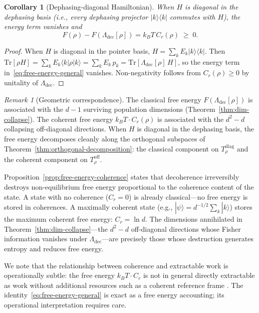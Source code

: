 \documentclass[12pt,a4paper]{article}
\newtheorem{corollary}[theorem]{Corollary}
\theoremstyle{definition}
\theoremstyle{remark}
\newtheorem{remark}[theorem]{Remark}
\begin{document}
\begin{corollary}[Dephasing-diagonal Hamiltonian]
\label{cor:diagonal-hamiltonian}
When $H$ is diagonal in the dephasing basis (i.e., every dephasing projector $|k\rangle\langle k|$ commutes with $H$), the energy term vanishes and
\begin{equation}
\label{eq:free-energy-diagonal-H}
F(\rho) - F(\Lambda_{\mathrm{dec}}[\rho]) = k_B T\, C_r(\rho) \;\geq\; 0.
\end{equation}
\end{corollary}

\begin{proof}
When $H$ is diagonal in the pointer basis, $H = \sum_k E_k |k\rangle\langle k|$.  Then $\mathrm{Tr}[\rho H] = \sum_k E_k \langle k|\rho|k\rangle = \sum_k E_k\, p_k = \mathrm{Tr}[\Lambda_{\mathrm{dec}}[\rho]\, H]$, so the energy term in~\eqref{eq:free-energy-general} vanishes.  Non-negativity follows from $C_r(\rho) \geq 0$ by unitality of $\Lambda_{\mathrm{dec}}$.
\end{proof}

\begin{remark}[Geometric correspondence]
\label{rem:geometric-correspondence}
The classical free energy $F(\Lambda_{\mathrm{dec}}[\rho])$ is associated with the $d - 1$ surviving population dimensions (Theorem~\ref{thm:dim-collapse}).  The coherent free energy $k_B T \cdot C_r(\rho)$ is associated with the $d^2 - d$ collapsing off-diagonal directions.  When $H$ is diagonal in the dephasing basis, the free energy decomposes cleanly along the orthogonal subspaces of Theorem~\ref{thm:orthogonal-decomposition}: the classical component on $T_\rho^{\mathrm{diag}}$ and the coherent component on $T_\rho^{\mathrm{off}}$.
\end{remark}

Proposition~\ref{prop:free-energy-coherence} states that decoherence irreversibly destroys non-equilibrium free energy proportional to the coherence content of the state.  A state with no coherence ($C_r = 0$) is already classical---no free energy is stored in coherences.  A maximally coherent state (e.g., $|\psi\rangle = d^{-1/2} \sum_k |k\rangle$) stores the maximum coherent free energy: $C_r = \ln d$.  The dimensions annihilated in Theorem~\ref{thm:dim-collapse}---the $d^2 - d$ off-diagonal directions whose Fisher information vanishes under $\Lambda_{\mathrm{dec}}$---are precisely those whose destruction generates entropy and reduces free energy.

We note that the relationship between coherence and extractable work is operationally subtle: the free energy $k_B T \cdot C_r$ is not in general directly extractable as work without additional resources such as a coherent reference frame \cite{lostaglio2015description,korzekwa2016extraction}.  The identity~\eqref{eq:free-energy-general} is exact as a free energy accounting; its operational interpretation requires care.
\end{document}
